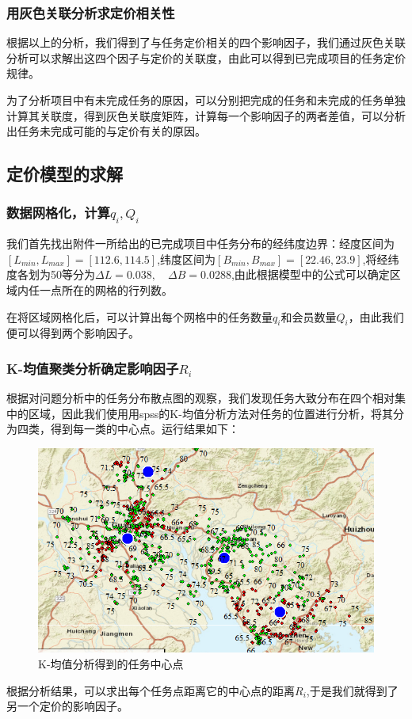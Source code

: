 \documentclass[withoutpreface,bwprint]{cumcmthesis} %
\begin{document}
\subsubsection{用灰色关联分析求定价相关性}

根据以上的分析，我们得到了与任务定价相关的四个影响因子，我们通过灰色关联分析可以求解出这四个因子与定价的关联度，由此可以得到已完成项目的任务定价规律。

为了分析项目中有未完成任务的原因，可以分别把完成的任务和未完成的任务单独计算其关联度，得到灰色关联度矩阵，计算每一个影响因子的两者差值，可以分析出任务未完成可能的与定价有关的原因。

\subsection{定价模型的求解}
\subsubsection{数据网格化，计算$q_i,Q_i$}

我们首先找出附件一所给出的已完成项目中任务分布的经纬度边界：经度区间为$[L_{min},L_{max}]=[112.6,114.5]$,纬度区间为$[B_{min},B_{max}]=[22.46,23.9]$,将经纬度各划为50等分为$\Delta L=0.038,\quad \Delta B=0.0288$,由此根据模型中的公式可以确定区域内任一点所在的网格的行列数。

在将区域网格化后，可以计算出每个网格中的任务数量$q_i$和会员数量$Q_i$，由此我们便可以得到两个影响因子。

\subsubsection{K-均值聚类分析确定影响因子$R_i$}

根据对问题分析中的任务分布散点图的观察，我们发现任务大致分布在四个相对集中的区域，因此我们使用用spss的K-均值分析方法对任务的位置进行分析，将其分为四类，得到每一类的中心点。运行结果如下：
\begin{figure}[H]
    \centering
    \includegraphics[width=1\textwidth]{2.png}
    \caption{K-均值分析得到的任务中心点}
    \label{图}
\end{figure}
根据分析结果，可以求出每个任务点距离它的中心点的距离$R_i$,于是我们就得到了另一个定价的影响因子。
\end{document}

